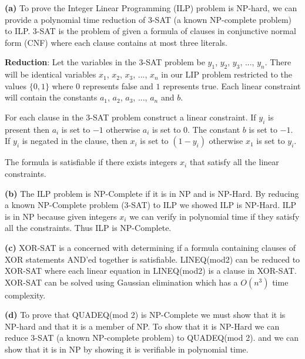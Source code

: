 \documentclass[11pt]{article}
\renewcommand\part[1]{\vspace{.10in}\textbf{(#1)}}
\begin{document}
\part{a} To prove the Integer Linear Programming (ILP) problem is NP-hard, we can provide a polynomial time reduction of 3-SAT (a known NP-complete problem) to ILP. 3-SAT is the problem of given a formula of clauses in conjunctive normal form (CNF) where each clause contains at most three literals.

\textbf{Reduction}: Let the variables in the 3-SAT problem be $y_1$, $y_2$, $y_3$, ..., $y_n$. There will be identical variables $x_1$, $x_2$, $x_3$, ..., $x_n$ in our LIP problem restricted to the values $\{0, 1\}$ where $0$ represents false and $1$ represents true. Each linear constraint will contain the constants $a_1$, $a_2$, $a_3$, ..., $a_n$ and $b$.

	For each clause in the 3-SAT problem construct a linear constraint. If $y_i$ is present then $a_i$ is set to $-1$ otherwise $a_i$ is set to $0$. The constant $b$ is set to $-1$. If $y_i$ is negated in the clause, then $x_i$ is set to $(1 - y_i)$ otherwise $x_1$ is set to $y_i$.
	
	The formula is satisfiable if there exists integers $x_i$ that satisfy all the linear constraints.
	
\part{b} The ILP problem is NP-Complete if it is in NP and is NP-Hard. By reducing a known NP-Complete problem (3-SAT) to ILP we showed ILP is NP-Hard. ILP is in NP because given integers $x_i$ we can verify in polynomial time if they satisfy all the constraints. Thus ILP is NP-Complete.

\part{c} XOR-SAT is a concerned with determining if a formula containing clauses of XOR statements AND'ed together is satisfiable. LINEQ(mod2) can be reduced to XOR-SAT where each linear equation in LINEQ(mod2) is a clause in XOR-SAT. XOR-SAT can be solved using Gaussian elimination which has a $O(n^3)$ time complexity.


\part{d} To prove that QUADEQ(mod 2) is NP-Complete we must show that it is NP-hard and that it is a member of NP. To show that it is NP-Hard we can reduce 3-SAT (a known NP-complete problem) to QUADEQ(mod 2). and we can show that it is in NP by showing it is verifiable in polynomial time.
\end{document}
